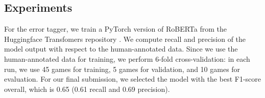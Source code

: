 \documentclass[12pt,notitlepage,a4paper,oneside,openany]{report}
\newcommand{\errnum}[1]{{\leavevmode\color{errblue} \underLine{\textbf{#1\textsuperscript{N}}}}}
\newcommand{\errent}[1]{{\leavevmode\color{errred} \underLine{\textbf{#1\textsuperscript{E}}}}}
\renewcommand\cite{\citep}
\begin{document}


\subsection{Experiments}
\label{sec:tok-eval:experiments}

For the error tagger, we train a PyTorch version of RoBERTa from the Huggingface Transfomers repository \cite{wolf2019HuggingFacesTS}. We compute recall and precision of the model output with respect to the human-annotated data. Since we use the human-annotated data for training, we perform 6-fold cross-validation: in each run, we use 45 games for training, 5 games for validation, and 10 games for evaluation. For our final submission, we selected the model with the best F1-score overall, which is 0.65 (0.61 recall and 0.69 precision).
\end{document}
